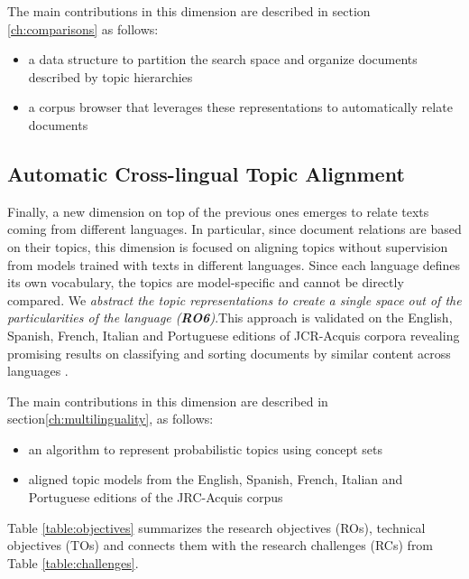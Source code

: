 The main contributions in this dimension are described in section \ref{ch:comparisons} as follows:
\begin{itemize}
\item a data structure to partition the search space and organize documents described by topic hierarchies
\item a corpus browser that leverages these representations to automatically relate documents
\end{itemize} 


\subsection{Automatic Cross-lingual Topic Alignment}

Finally, a new dimension on top of the previous ones emerges to relate texts coming from different languages. In particular, since document relations are based on their topics, this dimension is focused on aligning topics without supervision from models trained with texts in different languages. Since each language defines its own vocabulary, the topics are model-specific and cannot be directly compared. We \textit{abstract the topic representations to create a single space out of the particularities of the language (\textbf{RO6})}.This approach is validated on the English, Spanish, French, Italian and Portuguese editions of JCR-Acquis corpora revealing promising results on classifying and sorting documents by similar content across languages \citep{Badenes-Olmedo2019}\citep{Badenes-Olmedo2019b}. 

The main contributions in this dimension are described in section\ref{ch:multilinguality}, as follows: 
\begin{itemize}
\item an algorithm to represent probabilistic topics using concept sets
\item aligned topic models from the English, Spanish, French, Italian and Portuguese editions of the JRC-Acquis corpus
\end{itemize}

Table \ref{table:objectives} summarizes the research objectives (ROs), technical objectives (TOs) and connects them with the research challenges (RCs) from Table \ref{table:challenges}.


